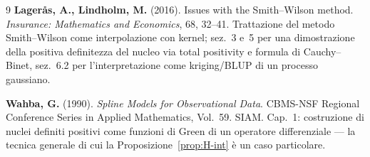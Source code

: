 \documentclass[11pt,a4paper]{article}
\theoremstyle{plain}
\theoremstyle{definition}
\theoremstyle{remark}
\begin{document}
\begin{thebibliography}{9}
  \textbf{Lager\aa s, A., Lindholm, M.} (2016).
  Issues with the Smith--Wilson method.
  \textit{Insurance: Mathematics and Economics}, 68, 32--41.
  Trattazione del metodo Smith--Wilson come interpolazione con kernel; sez.~3 e~5 per una
  dimostrazione della positiva definitezza del nucleo via total positivity e formula di
  Cauchy--Binet, sez.~6.2 per l'interpretazione come kriging/BLUP di un processo gaussiano.

  \textbf{Wahba, G.} (1990).
  \textit{Spline Models for Observational Data}.
  CBMS-NSF Regional Conference Series in Applied Mathematics, Vol.~59. SIAM.
  Cap.~1: costruzione di nuclei definiti positivi come funzioni di Green di un operatore
  differenziale --- la tecnica generale di cui la Proposizione~\ref{prop:H-int} \`e un caso
  particolare.

\end{thebibliography}
\end{document}
